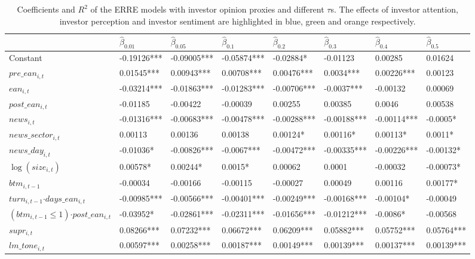 \documentclass[11pt]{article}
\begin{document}
\begin{small}
\begin{table}

\caption{\label{tab:table1}Coefficients and $R^2$ of the ERRE models with investor opinion proxies and different $\tau$s.
                           The effects of investor attention, investor perception and investor sentiment
                           are highlighted in blue, green and orange respectively.}
\centering
\begin{tabular}[t]{l|l|l|l|l|l|l|l}
\hline
  & $\hat\beta_{0.01}$ & $\hat\beta_{0.05}$ & $\hat\beta_{0.1}$ & $\hat\beta_{0.2}$ & $\hat\beta_{0.3}$ & $\hat\beta_{0.4}$ & $\hat\beta_{0.5}$\\
\hline
Constant & -0.19126*** & -0.09005*** & -0.05874*** & -0.02884* & -0.01123 & 0.00285 & 0.01624\\
\hline
$pre\_ean_{i,t}$ & 0.01545*** & 0.00943*** & 0.00708*** & 0.00476*** & 0.0034*** & 0.00226*** & 0.00123\\
\hline
$ean_{i,t}$ & -0.03214*** & -0.01863*** & -0.01283*** & -0.00706*** & -0.0037*** & -0.00132 & 0.00069\\
\hline
$post\_ean_{i,t}$ & -0.01185 & -0.00422 & -0.00039 & 0.00255 & 0.00385 & 0.0046 & 0.00538\\
\hline
$news_{i,t}$& -0.01316*** & -0.00683*** & -0.00478*** & -0.00288*** & -0.00188*** & -0.00114*** & -0.0005*\\
\hline
$news\_sector_{i,t}$& 0.00113 & 0.00136 & 0.00138 & 0.00124* & 0.00116* & 0.00113* & 0.0011*\\
\hline
$news\_day_{i,t}$ & -0.01036* & -0.00826*** & -0.0067*** & -0.00472*** & -0.00335*** & -0.00226*** & -0.00132*\\
\hline
$\log(size_{i,t})$ & 0.00578* & 0.00244* & 0.0015* & 0.00062 & 0.0001 & -0.00032 & -0.00073*\\
\hline
$btm_{i,t-1}$  & -0.00034 & -0.00166 & -0.00115 & -0.00027 & 0.00049 & 0.00116 & 0.00177*\\
\hline
$turn_{i,t-1}$$\cdot days\_ean_{i,t}$ & -0.00985*** & -0.00566*** & -0.00401*** & -0.00249*** & -0.00168*** & -0.00104* & -0.00049\\
\hline
$(btm_{i,t-1}\leq 1)$$\cdot post\_ean_{i,t}$& -0.03952* & -0.02861*** & -0.02311*** & -0.01656*** & -0.01212*** & -0.0086* & -0.00568\\
\hline
$supr_{i,t}$ & 0.08266*** & 0.07232*** & 0.06672*** & 0.06209*** & 0.05882*** & 0.05752*** & 0.05764***\\
\hline
$lm\_tone_{i,t}$ & 0.00597*** & 0.00258*** & 0.00187*** & 0.00149*** & 0.00139*** & 0.00137*** & 0.00139***\\

\end{tabular}
\end{table}
\end{small}
\end{document}
